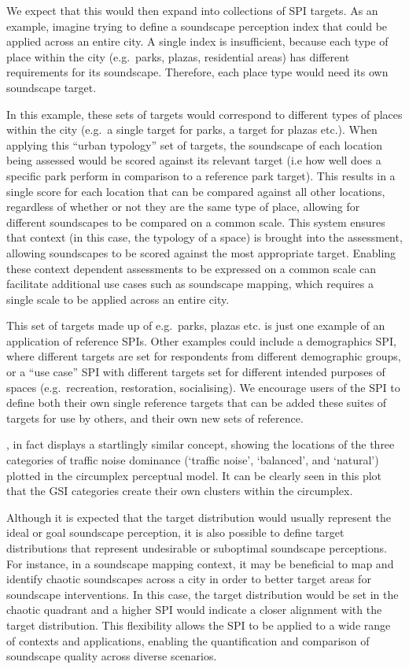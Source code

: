 \documentclass[
  authoryear,
  preprint,
  3p]{elsarticle}
\begin{document}
We expect that this would then expand into collections of SPI targets.
As an example, imagine trying to define a soundscape perception index
that could be applied across an entire city. A single index is
insufficient, because each type of place within the city (e.g.~parks,
plazas, residential areas) has different requirements for its
soundscape. Therefore, each place type would need its own soundscape
target.

In this example, these sets of targets would correspond to different
types of places within the city (e.g.~a single target for parks, a
target for plazas etc.). When applying this ``urban typology'' set of
targets, the soundscape of each location being assessed would be scored
against its relevant target (i.e how well does a specific park perform
in comparison to a reference park target). This results in a single
score for each location that can be compared against all other
locations, regardless of whether or not they are the same type of place,
allowing for different soundscapes to be compared on a common scale.
This system ensures that context (in this case, the typology of a space)
is brought into the assessment, allowing soundscapes to be scored
against the most appropriate target. Enabling these context dependent
assessments to be expressed on a common scale can facilitate additional
use cases such as soundscape mapping, which requires a single scale to
be applied across an entire city.

This set of targets made up of e.g.~parks, plazas etc. is just one
example of an application of reference SPIs. Other examples could
include a demographics SPI, where different targets are set for
respondents from different demographic groups, or a ``use case'' SPI
with different targets set for different intended purposes of spaces
(e.g.~recreation, restoration, socialising). We encourage users of the
SPI to define both their own single reference targets that can be added
these suites of targets for use by others, and their own new sets of
reference.

\citep[Fig.6]{Kogan2018Green}, in fact displays a startlingly similar
concept, showing the locations of the three categories of traffic noise
dominance (`traffic noise', `balanced', and `natural') plotted in the
circumplex perceptual model. It can be clearly seen in this plot that
the GSI categories create their own clusters within the circumplex.

Although it is expected that the target distribution would usually
represent the ideal or goal soundscape perception, it is also possible
to define target distributions that represent undesirable or suboptimal
soundscape perceptions. For instance, in a soundscape mapping context,
it may be beneficial to map and identify chaotic soundscapes across a
city in order to better target areas for soundscape interventions. In
this case, the target distribution would be set in the chaotic quadrant
and a higher SPI would indicate a closer alignment with the target
distribution. This flexibility allows the SPI to be applied to a wide
range of contexts and applications, enabling the quantification and
comparison of soundscape quality across diverse scenarios.
\end{document}
